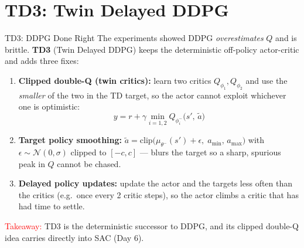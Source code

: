 \section{TD3: Twin Delayed DDPG}
\begin{frame}{TD3: DDPG Done Right }
\vspace{0.3em}
The experiments showed DDPG \emph{overestimates} $Q$ and is brittle. \textbf{TD3} (Twin Delayed DDPG) keeps the deterministic off-policy actor-critic and adds three fixes:
\begin{enumerate}
    \footnotesize
    \setlength{\itemsep}{0.5em}
    \item \textbf{Clipped double-Q (twin critics):} learn two critics $Q_{\phi_1}, Q_{\phi_2}$ and use the \emph{smaller} of the two in the TD target, so the actor cannot exploit whichever one is optimistic:
    \[
    y = r + \gamma \min_{i=1,2} Q_{\phi_i^{-}}\!\big(s',\, \tilde a\big)
    \]
    \item \textbf{Target policy smoothing:} $\tilde a = \mathrm{clip}\big(\mu_{\theta^{-}}(s') + \epsilon,\; a_{\min},\, a_{\max}\big)$ with $\epsilon \sim \mathcal{N}(0,\sigma)$ clipped to $[-c,c]$ --- blurs the target so a sharp, spurious peak in $Q$ cannot be chased.
    \item \textbf{Delayed policy updates:} update the actor and the targets less often than the critics (e.g.\ once every 2 critic steps), so the actor climbs a critic that has had time to settle.
\end{enumerate}
\vspace{0.4em}
\footnotesize\textcolor{red}{Takeaway:} TD3 is the deterministic successor to DDPG, and its clipped double-Q idea carries directly into SAC (Day 6).
\end{frame}
